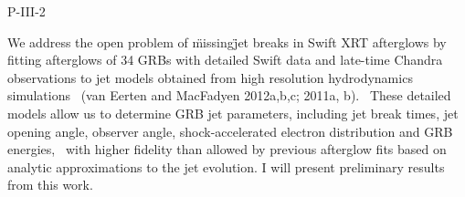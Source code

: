 P-III-2


\bigskip



\bigskip

\noindent We address the open problem of \"missing\" jet breaks in Swift XRT afterglows by fitting afterglows of 34 GRBs with detailed Swift data and late-time Chandra observations to jet models obtained from high resolution hydrodynamics simulations  (van Eerten and MacFadyen 2012a,b,c; 2011a, b).  These detailed models allow us to determine GRB jet parameters, including jet break times, jet opening angle, observer angle, shock-accelerated electron distribution and GRB energies,  with higher fidelity than allowed by previous afterglow fits based on analytic approximations to the jet evolution.  I will present preliminary results from this work.

